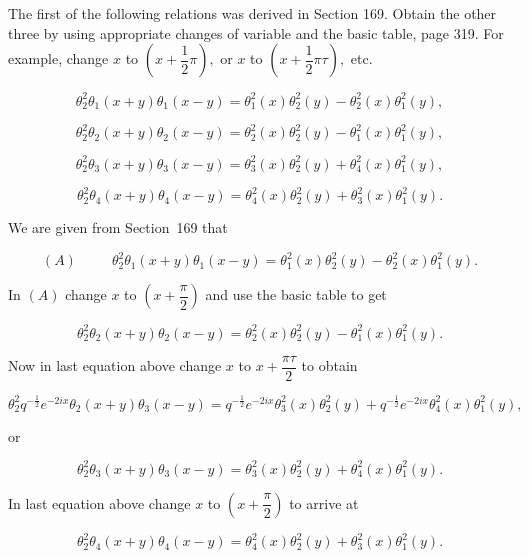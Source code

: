 \begin{problem}\label{problem4chapter20}
The first of the following relations was derived in Section 169. Obtain the other three by using appropriate changes of variable and the basic table, page 319. For example, change $x$ to $\left(x + \dfrac{1}{2} \pi \right),$ or $x$ to $\left( x + \dfrac{1}{2} \pi \tau \right),$ etc.

$$\theta_2^2\theta_1(x+y)\theta_1(x-y) = \theta_1^2(x)\theta_2^2(y) - \theta_2^2(x)\theta_1^2(y),$$

$$\theta_2^2\theta_2(x+y)\theta_2(x-y) = \theta_2^2(x)\theta_2^2(y) - \theta_1^2(x) \theta_1^2(y),$$

$$\theta_2^2\theta_3(x+y)\theta_3(x-y) = \theta_3^2(x)\theta_2^2(y) + \theta_4^2(x) \theta_1^2(y),$$

$$\theta_2^2\theta_4(x+y)\theta_4(x-y) = \theta_4^2(x)\theta_2^2(y) + \theta_3^2(x) \theta_1^2(y).$$
\end{problem}
\begin{solution}
We are given from Section~169 that

$$(A) \hspace{30pt} \theta_2^2 \theta_1(x+y) \theta_1(x-y) = \theta_1^2(x) \theta_2^2(y) - \theta_2^2(x) \theta_1^2(y).$$

In $(A)$ change $x$ to $\left(x + \dfrac{\pi}{2} \right)$ and use the basic table to get

$$\theta_2^2 \theta_2(x+y) \theta_2(x-y) = \theta_2^2(x) \theta_2^2(y) - \theta_1^2(x) \theta_1^2(y).$$

Now in last equation above change $x$ to $x + \dfrac{\pi \tau}{2}$ to obtain

$$\theta_2^2 q^{-\frac{1}{2}} e^{-2ix} \theta_2(x+y) \theta_3(x-y) = q^{-\frac{1}{2}} e^{-2ix} \theta_3^2(x) \theta_2^2(y) + q^{-\frac{1}{2}} e^{-2ix} \theta_4^2(x) \theta_1^2(y),$$

or

$$\theta_2^2 \theta_3(x+y) \theta_3(x-y) = \theta_3^2(x) \theta_2^2(y) + \theta_4^2(x) \theta_1^2(y).$$

In last equation above change $x$ to $\left( x + \dfrac{\pi}{2} \right)$ to arrive at

$$\theta_2^2 \theta_4(x+y)\theta_4(x-y) = \theta_4^2(x) \theta_2^2(y) + \theta_3^2(x) \theta_1^2(y).$$
\end{solution}
